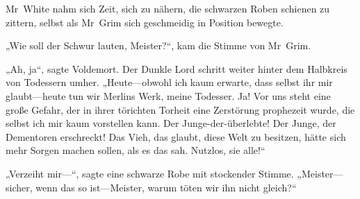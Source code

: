 Mr~White nahm sich Zeit, sich zu nähern, die schwarzen Roben schienen zu zittern, selbst als Mr~Grim sich geschmeidig in Position bewegte.

„Wie soll der Schwur lauten, Meister?“, kam die Stimme von Mr~Grim.

„Ah, ja“, sagte Voldemort. Der Dunkle Lord schritt weiter hinter dem Halbkreis von Todessern umher.
„Heute—obwohl ich kaum erwarte, dass selbst ihr mir glaubt—heute tun wir Merlins Werk, meine Todesser. Ja! Vor uns steht eine große Gefahr, der in ihrer törichten Torheit eine Zerstörung prophezeit wurde, die selbst ich mir kaum vorstellen kann. Der Junge-der-überlebte! Der Junge, der Dementoren erschreckt! Das Vieh, das glaubt, diese Welt zu besitzen, hätte sich mehr Sorgen machen sollen, als es das sah. Nutzlos, sie alle!“

„Verzeiht mir—“, sagte eine schwarze Robe mit stockender Stimme. „Meister—sicher, wenn das so ist—Meister, warum töten wir ihn nicht gleich?“

